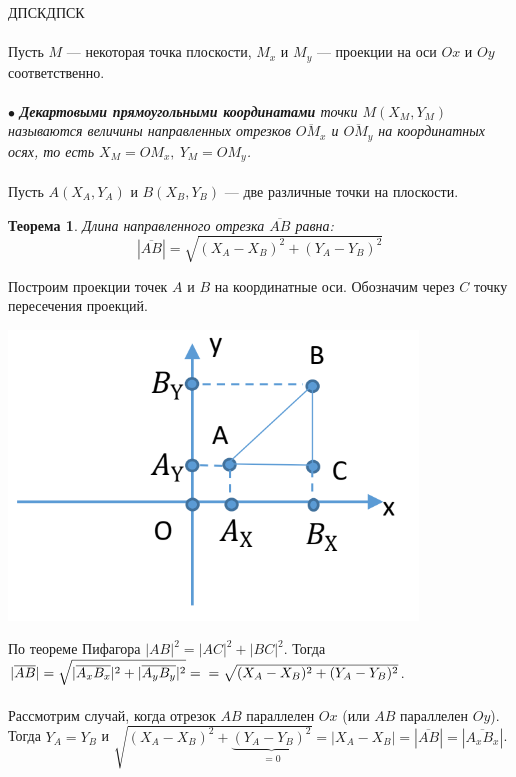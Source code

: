  ДПСК\qquad\qquad\qquad\qquad\qquad\qquad\qquad\qquad{} ДПСК\\\\
Пусть $M$ --- некоторая точка плоскости, $M_x$ и $M_y$ --- проекции на оси $Ox$ и $Oy$ соответственно.\\\\
$\bullet$ \textit{\textbf{Декартовыми прямоугольными координатами} точки $M(X_M, Y_M)$ называются величины направленных отрезков $\overline{OM_x}$ и $\overline{OM_y}$ на координатных осях, то есть $X_M = OM_x,\ Y_M = OM_y$.}\\\\
Пусть $A(X_A, Y_A)$ и $B(X_B, Y_B)$ --- две различные точки на плоскости.
\newtheorem*{t2_1}{Теорема}\begin{t2_1}Длина направленного отрезка $\overline{AB}$ равна:
	$$|\overline{AB}| = \sqrt{(X_A - X_B)^2 + (Y_A - Y_B)^2}$$\end{t2_1}
\begin{Proof}
	Построим проекции точек $A$ и $B$ на координатные оси. Обозначим через $C$ точку пересечения проекций.\begin{center}
		\includegraphics[scale=0.4]{images/t2_1dpsk.png}
	\end{center}
	По теореме Пифагора $|AB|^2 = |AC|^2 + |BC|^2$. Тогда $|\overline{AB}| = \sqrt{|\overline{A_xB_x}|^2 + |\overline{A_yB_y}|^2} =\\ =\sqrt{(X_A - X_B)^2 + (Y_A - Y_B)^2}$.\\\\
	Рассмотрим случай, когда отрезок $AB$ параллелен $Ox$ (или $AB$ параллелен $Oy$). Тогда $Y_A = Y_B$ и $\sqrt{(X_A - X_B)^2 + \underbrace{(Y_A - Y_B)^2}_{=0}} = |X_A - X_B| = |\overline{AB}| = |\overline{A_xB_x}|$.
\end{Proof}\\\\
